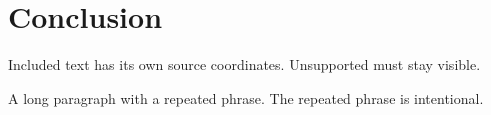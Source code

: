 \section{Conclusion}
Included text has its own source coordinates. Unsupported  must stay visible.

A long paragraph with a repeated phrase. The repeated phrase is intentional.
